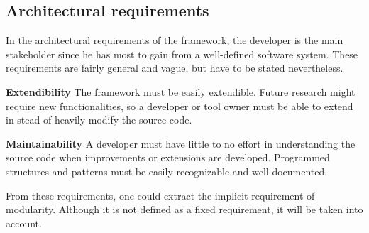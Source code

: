 \documentclass[a4paper]{article}
\begin{document}
\subsection{Architectural requirements}
In the architectural requirements of the framework, the developer is the main stakeholder since he has most to gain from a well-defined software system. These requirements are fairly general and vague, but have to be stated nevertheless.
\begin{description}
\item{\textbf{Extendibility}} The framework must be easily extendible. Future research might require new functionalities, so a developer or tool owner must be able to extend in stead of heavily modify the source code.
\item{\textbf{Maintainability}} A developer must have little to no effort in understanding the source code when improvements or extensions are developed. Programmed structures and patterns must be easily recognizable and well documented.
\end{description}
From these requirements, one could extract the implicit requirement of modularity. Although it is not defined as a fixed requirement, it will be taken into account.

\end{document}
